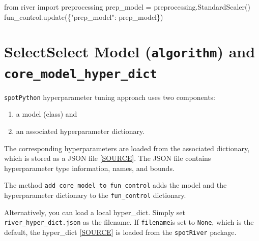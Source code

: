 \documentclass[
  letterpaper,
  DIV=11,
  numbers=noendperiod]{scrreprt}
\newenvironment{Shaded}{\begin{snugshade}}{\end{snugshade}}
\newcommand{\ImportTok}[1]{\textcolor[rgb]{0.00,0.46,0.62}{#1}}
\newcommand{\NormalTok}[1]{\textcolor[rgb]{0.00,0.23,0.31}{#1}}
\newcommand{\OperatorTok}[1]{\textcolor[rgb]{0.37,0.37,0.37}{#1}}
\newcommand{\StringTok}[1]{\textcolor[rgb]{0.13,0.47,0.30}{#1}}
\providecommand{\tightlist}{%
  \setlength{\itemsep}{0pt}\setlength{\parskip}{0pt}}\usepackage{longtable,booktabs,array}
\begin{document}
\begin{Shaded}
\begin{Highlighting}[]
\ImportTok{from}\NormalTok{ river }\ImportTok{import}\NormalTok{ preprocessing}
\NormalTok{prep\_model }\OperatorTok{=}\NormalTok{ preprocessing.StandardScaler()}
\NormalTok{fun\_control.update(\{}\StringTok{"prep\_model"}\NormalTok{: prep\_model\})}
\end{Highlighting}
\end{Shaded}

\hypertarget{selectselect-model-algorithm-and-core_model_hyper_dict-2}{%
\section{\texorpdfstring{SelectSelect Model (\texttt{algorithm}) and
\texttt{core\_model\_hyper\_dict}}{SelectSelect Model (algorithm) and core\_model\_hyper\_dict}}\label{selectselect-model-algorithm-and-core_model_hyper_dict-2}}

\texttt{spotPython} hyperparameter tuning approach uses two components:

\begin{enumerate}
\def\labelenumi{\arabic{enumi}.}
\tightlist
\item
  a model (class) and
\item
  an associated hyperparameter dictionary.
\end{enumerate}

The corresponding hyperparameters are loaded from the associated
dictionary, which is stored as a JSON file
\href{https://github.com/sequential-parameter-optimization/spotRiver/blob/main/src/spotRiver/data/river_hyper_dict.json}{{[}SOURCE{]}}.
The JSON file contains hyperparameter type information, names, and
bounds.

The method \texttt{add\_core\_model\_to\_fun\_control} adds the model
and the hyperparameter dictionary to the \texttt{fun\_control}
dictionary.

Alternatively, you can load a local hyper\_dict. Simply set
\texttt{river\_hyper\_dict.json} as the filename. If \texttt{filename}is
set to \texttt{None}, which is the default, the hyper\_dict
\href{https://github.com/sequential-parameter-optimization/spotRiver/blob/main/src/spotRiver/data/river_hyper_dict.json}{{[}SOURCE{]}}
is loaded from the \texttt{spotRiver} package.
\end{document}
